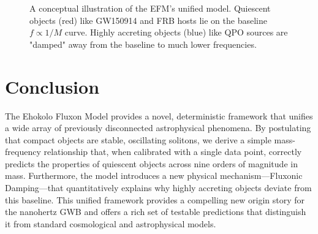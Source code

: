 \documentclass[11pt, twoside]{article}
\begin{document}
\begin{figure}[h!]
\centering
{}
\caption{A conceptual illustration of the EFM's unified model. Quiescent objects (red) like GW150914 and FRB hosts lie on the baseline \(f \propto 1/M\) curve. Highly accreting objects (blue) like QPO sources are "damped" away from the baseline to much lower frequencies.}
\label{fig:concordance}
\end{figure}

\section{Conclusion}
The Ehokolo Fluxon Model provides a novel, deterministic framework that unifies a wide array of previously disconnected astrophysical phenomena. By postulating that compact objects are stable, oscillating solitons, we derive a simple mass-frequency relationship that, when calibrated with a single data point, correctly predicts the properties of quiescent objects across nine orders of magnitude in mass. Furthermore, the model introduces a new physical mechanism—Fluxonic Damping—that quantitatively explains why highly accreting objects deviate from this baseline. This unified framework provides a compelling new origin story for the nanohertz GWB and offers a rich set of testable predictions that distinguish it from standard cosmological and astrophysical models.
\end{document}
